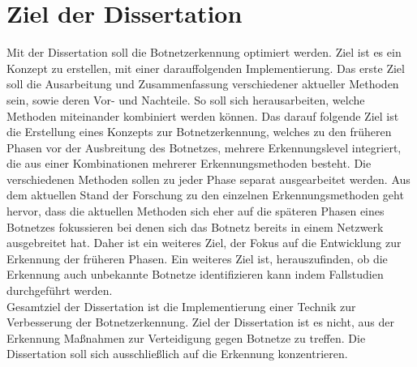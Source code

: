 \section{Ziel der Dissertation}
\label{sec:goals}

Mit der Dissertation soll die Botnetzerkennung optimiert werden. Ziel ist es ein Konzept zu erstellen, mit einer darauffolgenden Implementierung. Das erste Ziel soll 
die Ausarbeitung und Zusammenfassung verschiedener aktueller Methoden sein, sowie deren Vor- und Nachteile. So soll sich herausarbeiten, welche Methoden miteinander
kombiniert werden können. Das darauf folgende Ziel ist die Erstellung eines Konzepts zur Botnetzerkennung, welches zu den früheren Phasen vor der Ausbreitung des 
Botnetzes, mehrere Erkennungslevel integriert, die aus einer Kombinationen mehrerer Erkennungsmethoden besteht. Die verschiedenen Methoden sollen zu jeder Phase separat 
ausgearbeitet werden. Aus dem aktuellen Stand der Forschung zu den einzelnen Erkennungsmethoden geht hervor, 
dass die aktuellen Methoden sich eher auf die späteren Phasen eines Botnetzes fokussieren bei denen sich das Botnetz bereits in einem Netzwerk ausgebreitet hat. 
Daher ist ein weiteres Ziel, der Fokus auf die Entwicklung zur Erkennung der früheren Phasen. Ein weiteres Ziel ist, herauszufinden, ob die Erkennung auch unbekannte Botnetze 
identifizieren kann indem Fallstudien durchgeführt werden. \\ Gesamtziel der Dissertation ist die Implementierung einer Technik zur Verbesserung der Botnetzerkennung. Ziel der 
Dissertation ist es nicht, aus der Erkennung Maßnahmen zur Verteidigung gegen Botnetze zu treffen. Die Dissertation soll sich ausschließlich auf die Erkennung konzentrieren. 